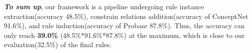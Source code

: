 
\textbf{\textit{To sum up}}, our framework is a pipeline undergoing rule instance extraction(accuracy 48.5\%), constrain relations addition(accuracy of ConceptNet 91.6\%), and rule induction(accuracy of Probase 87.8\%).
Thus, the accuracy can only reach \textbf{39.0\%} (48.5\%*91.6\%*87.8\%) at the maximum, which is close to our evaluation(32.5\%) of the final rules.


